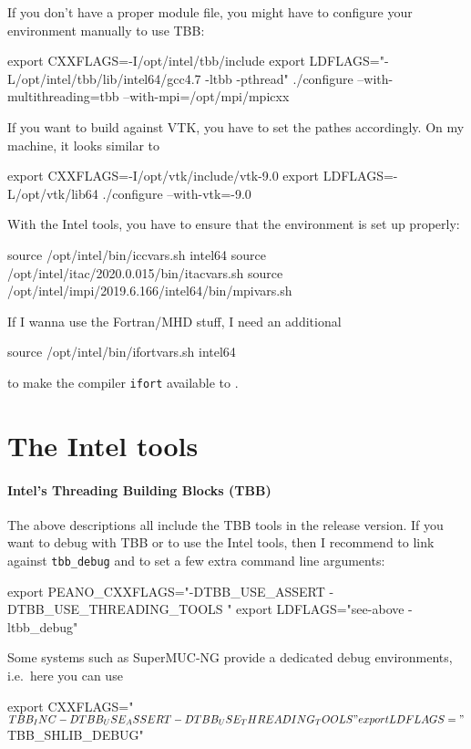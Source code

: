If you don't have a proper module file, you might have to configure your environment manually to use TBB:
\begin{code}
 export CXXFLAGS=-I/opt/intel/tbb/include
 export LDFLAGS="-L/opt/intel/tbb/lib/intel64/gcc4.7 -ltbb -pthread"
 ./configure --with-multithreading=tbb --with-mpi=/opt/mpi/mpicxx
\end{code}


If you want to build against VTK, you have to set the pathes accordingly. 
On my machine, it looks similar to
\begin{code}
 export CXXFLAGS=-I/opt/vtk/include/vtk-9.0
 export LDFLAGS=-L/opt/vtk/lib64
 ./configure --with-vtk=-9.0
\end{code}


With the Intel tools, you have to ensure that the environment is set up 
properly:
\begin{code}
source /opt/intel/bin/iccvars.sh intel64
source /opt/intel/itac/2020.0.015/bin/itacvars.sh
source /opt/intel/impi/2019.6.166/intel64/bin/mpivars.sh
\end{code}
\label{label:supercomputer:Intel-scripts}


If I wanna use the Fortran/MHD stuff, I need an additional
\begin{code}
source /opt/intel/bin/ifortvars.sh intel64
\end{code}
to make the compiler \texttt{ifort} available to \Peano.


\section{The Intel tools}
\label{section:supercomputers:IntelTools}

\paragraph{Intel's Threading Building Blocks (TBB)}

The above descriptions all include the TBB tools in the release version.
If you want to debug with TBB or to use the Intel tools, then I recommend to
link against \texttt{tbb\_debug} and to set a few extra command line arguments:

\begin{code}
 export PEANO_CXXFLAGS="-DTBB_USE_ASSERT -DTBB_USE_THREADING_TOOLS "
 export LDFLAGS="see-above   -ltbb_debug"
\end{code}

\noindent
Some systems such as SuperMUC-NG provide a dedicated debug environments,
i.e.~here you can use
\begin{code}
 export CXXFLAGS="$TBB_INC -DTBB_USE_ASSERT -DTBB_USE_THREADING_TOOLS "
 export LDFLAGS="$TBB_SHLIB_DEBUG"
\end{code}


